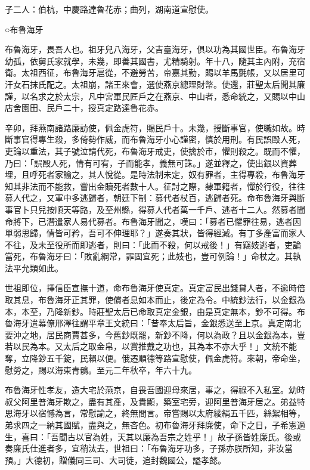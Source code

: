 \begin{pinyinscope}
 子二人：伯杭，中慶路達魯花赤；曲列，湖南道宣慰使。



 ○布魯海牙



 布魯海牙，畏吾人也。祖牙兒八海牙，父吉臺海牙，俱以功為其國世臣。布魯海牙幼孤，依舅氏家就學，未幾，即善其國書，尤精騎射。年十八，隨其主內附，充宿衛。太祖西征，布魯海牙扈從，不避勞苦，帝嘉其勤，賜以羊馬氈帳，又以居里可汗女石抹氏配之。太祖崩，諸王來會，選使燕京總理財幣。使還，莊聖太后聞其廉謹，以名求之於太宗，凡中宮軍民匠戶之在燕京、中山者，悉命統之，又賜以中山店舍園田、民戶二十，授真定路達魯花赤。



 辛卯，拜燕南諸路廉訪使，佩金虎符，賜民戶十。未幾，授斷事官，使職如故。時斷事官得專生殺，多倚勢作威，而布魯海牙小心謹密，慎於用刑。有民誤毆人死，吏論以重法，其子號泣請代死，布魯海牙戒吏，使擒於市，懼則殺之。既而不懼，乃曰：「誤毆人死，情有可宥，子而能孝，義無可誅。」遂並釋之，使出銀以資葬埋，且呼死者家諭之，其人悅從。是時法制未定，奴有罪者，主得專殺，布魯海牙知其非法而不能救，嘗出金贖死者數十人。征討之際，隸軍籍者，憚於行役，往往募人代之，又軍中多逃歸者，朝廷下制：募代者杖百，逃歸者死。命布魯海牙與斷事官卜只兒按順天等路，及至州縣，得募人代者萬一千戶、逃者十二人。然募者聞命將下，已潛遣家人易代募者。布魯海牙聞之，嘆曰：「募者已懼罪往易，逃者因單弱思歸，情皆可矜，吾可不伸理耶？」遂奏其狀，皆得經減。有丁多產富而家人不往，及未至役所而即逃者，則曰：「此而不殺，何以戒後！」有竊妓逃者，吏論當死，布魯海牙曰：「敗亂綱常，罪固宜死；此妓也，豈可例論！」命杖之。其執法平允類如此。



 世祖即位，擇信臣宣撫十道，命布魯海牙使真定。真定富民出錢貸人者，不逾時倍取其息，布魯海牙正其罪，使償者息如本而止，後定為令。中統鈔法行，以金銀為本，本至，乃降新鈔。時莊聖太后已命取真定金銀，由是真定無本，鈔不可得。布魯海牙遣幕僚邢澤往謂平章王文統曰：「昔奉太后旨，金銀悉送至上京。真定南北要沖之地，居民商賈甚多，今舊鈔既罷，新鈔不降，何以為政？且以金銀為本，豈若以民為本。又太后之取金帛，以賞推戴之功也，其為本不亦大乎！」文統不能奪，立降鈔五千錠，民賴以便。俄遷順德等路宣慰使，佩金虎符。來朝，帝命坐，慰勞之，賜以海東青鶻。至元二年秋卒，年六十九。



 布魯海牙性孝友，造大宅於燕京，自畏吾國迎母來居，事之，得祿不入私室。幼時叔父阿里普海牙欺之，盡有其產，及貴顯，築室宅旁，迎阿里普海牙居之。弟益特思海牙以宿憾為言，常慰諭之，終無間言。帝嘗賜以太府綾絹五千匹，絲絮相等，弟求四之一納其國賦，盡與之，無吝色。初布魯海牙拜廉使，命下之日，子希憲適生，喜曰：「吾聞古以官為姓，天其以廉為吾宗之姓乎！」故子孫皆姓廉氏。後或奏廉氏仕進者多，宜稍汰去，世祖曰：「布魯海牙功多，子孫亦朕所知，非汝當預。」大德初，贈儀同三司、大司徒，追封魏國公，謚孝懿。




\end{pinyinscope}
